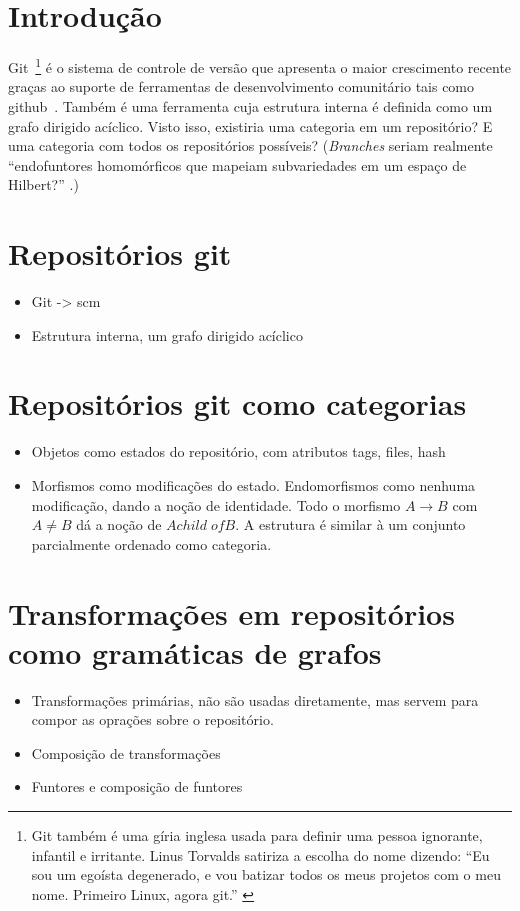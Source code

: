 \documentclass[a4paper]{article}
\begin{document}
\section*{Introdução}
Git~\cite{git}\footnote{Git também é uma gíria inglesa usada para definir uma pessoa ignorante, infantil e irritante. Linus Torvalds satiriza a escolha do nome dizendo: ``Eu sou um egoísta degenerado, e vou batizar todos os meus projetos com o meu nome. Primeiro Linux, agora git.'' \cite{linus-is-a-bastard}} é o sistema de controle de versão que apresenta o maior crescimento recente graças ao suporte de ferramentas de desenvolvimento comunitário tais como github~\cite{github}. Também é uma ferramenta cuja estrutura interna é definida como um grafo dirigido acíclico. Visto isso, existiria uma categoria em um repositório? E uma categoria com todos os repositórios possíveis? ({\it Branches} seriam realmente ``endofuntores homomórficos que mapeiam subvariedades em um espaço de Hilbert?'' \cite{joke}.)

\section*{Repositórios git}
\begin{itemize}
\item Git -> scm
\item Estrutura interna, um grafo dirigido acíclico
\end{itemize}
\section*{Repositórios git como categorias}
\begin{itemize}
\item Objetos como estados do repositório, com atributos tags, files, hash
\item Morfismos como modificações do estado. Endomorfismos como nenhuma modificação, dando a noção de identidade. Todo o morfismo $A \rightarrow B$ com $A \ne B$ dá a noção de $A child\;of B$. A estrutura é similar à um conjunto parcialmente ordenado como categoria.
\end{itemize}
\section*{Transformações em repositórios como gramáticas de grafos}
\begin{itemize}
\item Transformações primárias, não são usadas diretamente, mas servem para compor as oprações sobre o repositório.
\item Composição de transformações
\item Funtores e composição de funtores
\end{itemize}
\end{document}
